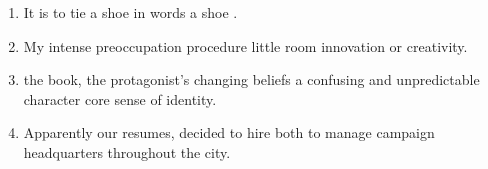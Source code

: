 \begin{enumerate}
\vfill\item

\begin{inparaenum}[A]
It is  to tie a shoe  in words  a shoe . 
\end{inparaenum}

\vfill\item

\begin{inparaenum}[A]
My  intense preoccupation  procedure  little room  innovation or creativity. 
\end{inparaenum}

\vfill\item

\begin{inparaenum}[A]
 the book, the protagonist's  changing beliefs  a confusing and unpredictable character  core sense of identity. 
\end{inparaenum}

\vfill
\newpage
\item

\begin{inparaenum}[A]
Apparently  our resumes,  decided to hire both  to manage  campaign headquarters throughout the city. 
\end{inparaenum}


\end{enumerate}
